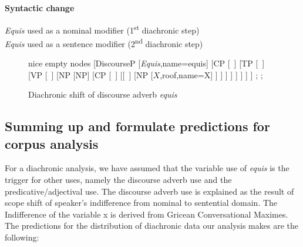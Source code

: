 \documentclass[output=paper
,modfonts
,nonflat]{langsci/langscibook}
\begin{document}
\ea \textbf{Syntactic change}\\
\begin{xlist}
	\textit{Equis} used as a nominal modifier (1\textsuperscript{st} diachronic step)\\
	\textit{Equis} used as a sentence modifier (2\textsuperscript{nd} diachronic step)\\
\end{xlist}
\z

\begin{figure}
	\caption{Diachronic shift of discourse adverb \textit{equis}\label{fig:kellert:tree4n}}
	\begin{forest} nice empty nodes
	[DiscourseP
	[\textit{Equis},name=equis] [CP
	[~] [TP
	[~] [VP
	[~] [NP
	[NP] [CP
	[~] [[~] [NP
	[$X$,roof,name=X]
	]
	]
	]
	]
	]
	]
	]
	]
	;
	;	
\end{forest}
\end{figure}

\subsection{Summing up and formulate predictions for corpus analysis}\label{sec:kellert:4.3}
For a diachronic analysis, we have assumed that the variable use of \textit{equis} is the trigger for other uses, namely the discourse adverb use and the predicative/adjectival use. The discourse adverb use is explained as the result of scope shift of speaker’s indifference from nominal to sentential domain. The Indifference of the variable x is derived from Gricean Conversational Maximes. The predictions for the distribution of diachronic data our analysis makes are the following:
\end{document}
